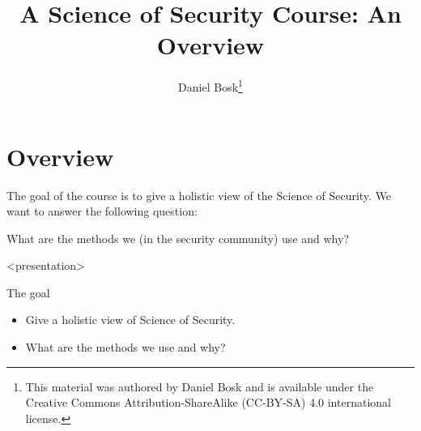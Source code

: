 \title{%
  A Science of Security Course: An Overview
}
\author{Daniel Bosk\thanks{%
    This material was authored by Daniel Bosk and is available under the 
    Creative Commons Attribution-ShareAlike (CC-BY-SA) 4.0 international 
    license.
}}


\mode*

\begin{abstract}
  
\end{abstract}

\clearpage
\tableofcontents
\clearpage

\section{Overview}


The goal of the course is to give a holistic view of the Science of Security.
We want to answer the following question:

\begin{frame}
  \begin{question}
    What are the methods we (in the security community) use and why?
  \end{question}
\end{frame}

\begin{frame}<presentation>
  \begin{block}{The goal}
    \begin{itemize}
      \item Give a holistic view of Science of Security.
      \item What are the methods we use and why?
    \end{itemize}
  \end{block}
\end{frame}

